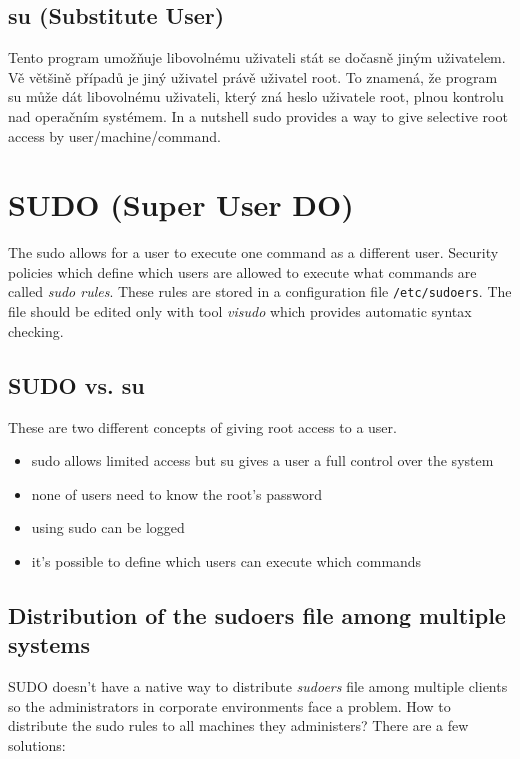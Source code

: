 \documentclass[12pt,a4paper,titlepage,final]{article}
\begin{document}
\subsection{su (Substitute User)}
Tento program umožňuje libovolnému uživateli stát se dočasně jiným uživatelem.
Vě většině případů je jiný uživatel právě uživatel root. To znamená, že program
su může dát libovolnému uživateli, který zná heslo uživatele root, plnou
kontrolu nad operačním systémem. In a nutshell sudo provides a way to give
selective root access by user/machine/command.


\section{SUDO (Super User DO)}

The sudo allows for a user to execute one command as a different user. Security
policies which define which users are allowed to execute what commands are
called \emph{sudo rules}. These rules are stored in a configuration file
\texttt{/etc/sudoers}. The file should be edited only with tool \emph{visudo}
which provides automatic syntax checking.

\subsection{SUDO vs. su}
These are two different concepts of giving root access to a user.

\begin{itemize}
	\item sudo allows limited access but su gives a user a full control over the
		system
	\item none of users need to know the root's password
	\item using sudo can be logged
	\item it's possible to define which users can execute which commands
\end{itemize}


\subsection{Distribution of the sudoers file among multiple systems}
SUDO doesn't have a native way to distribute \emph{sudoers} file among multiple
clients so the administrators in corporate environments face a problem. How to
distribute the sudo rules to all machines they administers? There are a few
solutions:
\end{document}
